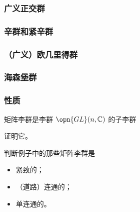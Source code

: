 \subsubsection{广义正交群}



\subsubsection{辛群和紧辛群}

\subsubsection{（广义）欧几里得群}

\subsubsection{海森堡群}

\subsubsection{性质}

\begin{theorem}{}
矩阵李群是李群 $\opn{GL}(n, \mathbb{C})$ 的子李群
\end{theorem}

\begin{exercise}{}
证明它。
\end{exercise}

\begin{exercise}{}
判断例子中的那些矩阵李群是
\begin{itemize}
\item 紧致的；
\item （道路）连通的；
\item 单连通的。
\end{itemize}
\end{exercise}

